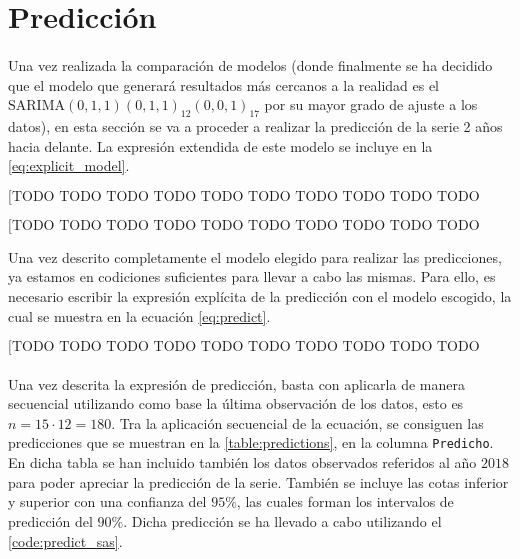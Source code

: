 \documentclass[a4paper, spanish]{article}
\begin{document}
  \section{Predicción}
  \label{sec:prediction}

    \paragraph{}
    Una vez realizada la comparación de modelos (donde finalmente se ha decidido que el modelo que generará resultados más cercanos a la realidad es el \textbf{$\text{SARIMA}(0, 1, 1)(0, 1, 1)_{12}(0, 0, 1)_{17}$} por su mayor grado de ajuste a los datos), en esta sección se va a proceder a realizar la predicción de la serie 2 años hacia delante. La expresión extendida de este modelo se incluye en la \autoref{eq:explicit_model}.

    \begin{equation}
    \label{eq:explicit_model}
      \text{[TODO TODO TODO TODO TODO TODO TODO TODO TODO TODO TODO ]}
    \end{equation}

    \begin{equation}
    \label{eq:explicit_model_extended}
      \text{[TODO TODO TODO TODO TODO TODO TODO TODO TODO TODO TODO ]}
    \end{equation}

    Una vez descrito completamente el modelo elegido para realizar las predicciones, ya estamos en codiciones suficientes para llevar a cabo las mismas. Para ello, es necesario escribir la expresión explícita de la predicción con el modelo escogido, la cual se muestra en la ecuación \autoref{eq:predict}.

    \begin{equation}
    \label{eq:predict}
      \text{[TODO TODO TODO TODO TODO TODO TODO TODO TODO TODO TODO ]}
    \end{equation}

    \paragraph{}
    Una vez descrita la expresión de predicción, basta con aplicarla de manera secuencial utilizando como base la última observación de los datos, esto es $n = 15 \cdot 12 = 180$. Tra la aplicación secuencial de la ecuación, se consiguen las predicciones que se muestran en la \autoref{table:predictions}, en la columna \texttt{Predicho}. En dicha tabla se han incluido también los datos observados referidos al año $2018$ para poder apreciar la predicción de la serie. También se incluye las cotas inferior y superior con una confianza del $95\%$, las cuales forman los intervalos de predicción del $90\%$. Dicha predicción se ha llevado a cabo utilizando el \autoref{code:predict_sas}.
\end{document}

